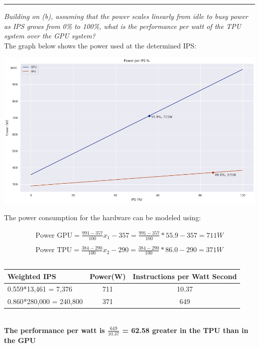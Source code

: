\documentclass[11pt]{exam}
\newcounter{questionCounter}
\newcounter{partCounter}[questionCounter]
\newenvironment{namedquestion}[1]{%
    \addtocounter{questionCounter}{1}%
    \setcounter{partCounter}{0}%
    \vspace{.2in}%
        \noindent{\bf #1}%
    \vspace{0.3em} \hrule \vspace{.1in}%
}{}
\begin{document}
\begin{namedquestion}{Problem 1.6C}
\textit{Building on (b), assuming that the power scales linearly from idle to busy power as IPS grows from 0\% to 100\%, what is the performance per watt of the TPU system over the GPU system?}\\


The graph below shows the power used at the determined IPS:

\begingroup
    \centering
    \medskip
    \includegraphics[width=\columnwidth]{Homework-Tex/img/power.png}
    \medskip
\endgroup

The power consumption for the hardware can be modeled using:

\begin{equation}
    \begin{split}
        \text{Power GPU} = \frac{991-357}{100}x_{1} - 357 = \frac{991-357}{100}*55.9 - 357 = 711W\\
        \\
        \text{Power TPU} = \frac{384-290}{100}x_{2} - 290 = \frac{384-290}{100}*86.0 - 290 = 371W\\
        \\
    \end{split}
\end{equation}

\begingroup
    \medskip
    \centering
    \def\arraystretch{1.5}
        \begin{tabular}{lcc}
            \toprule
            Weighted IPS & Power(W) & Instructions per Watt Second\\
            \midrule
            0.559*13,461 = 7,376 & 711 & 10.37\\
            0.860*280,000 = 240,800 & 371 & 649\\
            \bottomrule
        \end{tabular}
    \label{fig:noOptimization}
    \medskip
\endgroup

\\

\textbf{The performance per watt is $\frac{649}{10.37}$ = 62.58 greater in the TPU than in the GPU}

\end{namedquestion}
\end{document}
